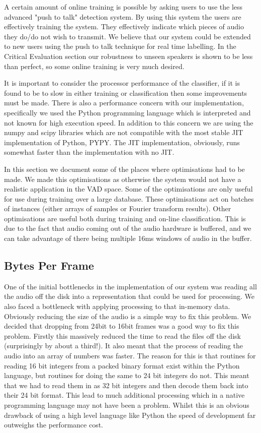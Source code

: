 \documentclass[ %
                    author={Sam Phippen},
                supervisor={Dr. Rafal Bogacz},
                     title={Real time voice activity detectors in noisy personal computing environments},
                  subtitle={},
                    degree={MEng},
                      year={2012} ]{thesis}
\begin{document}
A certain amount of online training is possible by asking users to use the less
advanced "push to talk" detection system. By using this system the users are
effectively training the system. They effectively indicate which pieces of
audio they do/do not wish to transmit. We believe that our system could be
extended to new users using the push to talk technique for real time labelling.
In the Critical Evaluation section our robustness to unseen speakers is shown
to be less than perfect, so some online training is very much desired.

It is important to consider the processor performance of the classifier, if it
is found to be to slow in either training or classification then some
improvements must be made. There is also a performance concern with our
implementation, specifically we used the Python\cite{python} programming
language which is interpreted and not known for high execution speed. In
addition to this concern we are using the numpy and scipy libraries which are
not compatible with the most stable JIT implementation of Python,
PYPY\cite{pypy}. The JIT implementation, obviously, runs somewhat faster than
the implementation with no JIT.

In this section we document some of the places where optimisations had to be
made. We made this optimisations as otherwise the system would not have a
realistic application in the VAD space. Some of the optimisations are only
useful for use during training over a large database. These optimisations act
on batches of instances (either arrays of samples or Fourier transform
results). Other optimisations are useful both during training and on-line
classification. This is due to the fact that audio coming out of the audio
hardware is buffered, and we can take advantage of there being multiple 16ms
windows of audio in the buffer.

\subsection{Bytes Per Frame}

One of the initial bottlenecks in the implementation of our system was reading
all the audio off the disk into a representation that could be used for
processing. We also faced a bottleneck with applying processing to that
in-memory data. Obviously reducing the size of the audio is a simple way to fix
this problem. We decided that dropping from 24bit to 16bit frames was a good
way to fix this problem. Firstly this massively reduced the time to read the
files off the disk (surprisingly by about a third!). It also meant that the
process of reading the audio into an array of numbers was faster. The reason
for this is that routines for reading 16 bit integers from a packed binary
format exist within the Python language, but routines for doing the same to 24
bit integers do not. This meant that we had to read them in as 32 bit integers
and then decode them back into their 24 bit format. This lead to much
additional processing which in a native programming language may not have been
a problem. Whilst this is an obvious drawback of using a high level language
like Python the speed of development far outweighs the performance cost.
\end{document}
